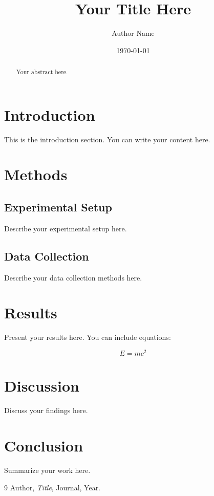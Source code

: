 \documentclass{article}
\title{Your Title Here}
\author{Author Name}
\date{\today}
\begin{document}
\maketitle

\begin{abstract}
Your abstract here.
\end{abstract}

\section{Introduction}

This is the introduction section. You can write your content here.

\section{Methods}

\subsection{Experimental Setup}

Describe your experimental setup here.

\subsection{Data Collection}

Describe your data collection methods here.

\section{Results}

Present your results here. You can include equations:

\begin{equation}
E = mc^2
\end{equation}

\section{Discussion}

Discuss your findings here.

\section{Conclusion}

Summarize your work here.

\begin{thebibliography}{9}
 Author, \emph{Title}, Journal, Year.
\end{thebibliography}
\end{document}
